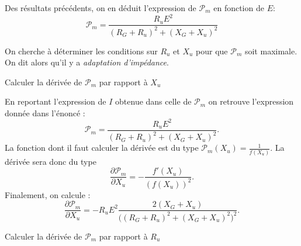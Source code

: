 

\pauseEntrainement


Des résultats précédents, on en déduit l'expression de $\mathcal{P}_{m}$ en fonction de $E$:
\[
\mathcal{P}_{m}=\dfrac{R_{u}E^2}{\left(R_{G}+R_{u}\right)^{2}+\left(X_{G}+X_{u}\right)^{2}}
\]


On cherche à déterminer les conditions sur $R_u$ et $X_u$ pour que $\mathcal{P}_m$ soit maximale. On dit alors qu'il y a \emph{adaptation d'impédance}.



\repriseEntrainement



\begin{enonce}
Calculer la dérivée de $\mathcal{P}_m$ par rapport à $X_u$
\end{enonce}

\begin{corrigeNewpage}
En reportant l'expression de $I$ obtenue dans celle de $\mathcal{P}_m$ on retrouve l'expression donnée dans l'énoncé : 
\[
\mathcal{P}_m=\frac{R_uE^2}{(R_G+ R_u)^2+(X_G+X_u)^2}.
\]
La fonction dont il faut calculer la dérivée est du type \(\mathcal{P}_m(X_u)=\frac{1}{f(X_u)}\). La dérivée sera donc du type 
\[
\frac{\partial \mathcal{P}_m}{\partial X_u} = -\frac{f'(X_u)}{(f(X_u))^2}.
\]
 Finalement, on calcule : 
\[
\frac{\partial \mathcal{P}_m}{\partial X_u}=-R_uE^2\frac{2(X_G+X_u)}{\Big((R_G+R_u)^2+(X_G+X_u)^2\Big)^2}.
\]
\end{corrigeNewpage}




\begin{enonce}
Calculer la dérivée de $\mathcal{P}_m$ par rapport à $R_u$
\end{enonce}

